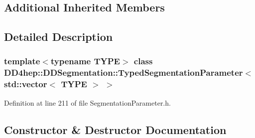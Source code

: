 \subsection*{Additional Inherited Members}


\subsection{Detailed Description}
\subsubsection*{template$<$typename T\+Y\+PE$>$\newline
class D\+D4hep\+::\+D\+D\+Segmentation\+::\+Typed\+Segmentation\+Parameter$<$ std\+::vector$<$ T\+Y\+P\+E $>$ $>$}



Definition at line 211 of file Segmentation\+Parameter.\+h.



\subsection{Constructor \& Destructor Documentation}
\hypertarget{class_d_d4hep_1_1_d_d_segmentation_1_1_typed_segmentation_parameter_3_01std_1_1vector_3_01_t_y_p_e_01_4_01_4_a4deba5d43284deab4fba1c05f0cbb563}{}\label{class_d_d4hep_1_1_d_d_segmentation_1_1_typed_segmentation_parameter_3_01std_1_1vector_3_01_t_y_p_e_01_4_01_4_a4deba5d43284deab4fba1c05f0cbb563} 
